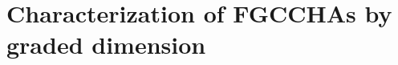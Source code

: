 \documentclass[11pt]{amsart}
\theoremstyle{definition}
\numberwithin{equation}{section}
\newcommand{\FGCCHAs}{\textsf{FGCCHA}s\xspace}
\begin{document}

%

\section{Characterization of \FGCCHAs by graded dimension}
\end{document}
